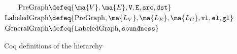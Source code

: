 
\begin{figure}[t]
        \begin{gather*}
          \begin{aligned}
            \mathrm{PreGraph}\defeq\{&\ma{V}, \ma{E}, \mathtt{V}, \mathtt{E}, \mathtt{src}, \mathtt{dst}\} \\
            \mathrm{LabeledGraph}\defeq\{&\mathrm{PreGraph},\ma{L_{V}},\ma{L_{E}},\ma{L_{G}}, \mathtt{vl},\mathtt{el},\mathtt{gl}\} \\
            \mathrm{GeneralGraph}\defeq\{&\mathrm{LabeledGraph},
            \mathtt{soundness}\}
          \end{aligned}\\
        \end{gather*}
\caption{Coq definitions of the hierarchy}
\label{fig:coqgraphs}
\vspace{-1em}
\end{figure} 